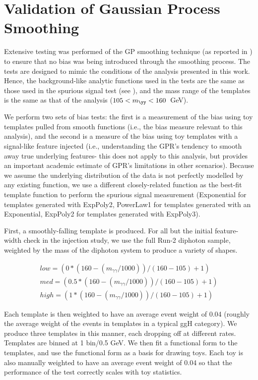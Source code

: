 \section{Validation of Gaussian Process Smoothing}
\label{sec:GPR_validation}
Extensive testing was performed of the GP smoothing technique (as reported in \Sect{\ref{ssec:bkg_smoothing}}) to ensure that no bias was being introduced through the smoothing process. The tests are designed to mimic the conditions of the analysis presented in this work. Hence, the background-like analytic functions used in the tests are the same as those used in the spurious signal test (see \Sect{\ref{ssec:spurious_signal}}), and the mass range of the templates is the same as that of the analysis ($105<m_{\yy}<160$~GeV). 

We perform two sets of bias tests: the first is a measurement of the bias using toy templates pulled from smooth functions (i.e., the bias measure relevant to this analysis), and the second is a measure of the bias using toy templates with a signal-like feature injected (i.e., understanding the GPR's tendency to smooth away true underlying features- this does not apply to this analysis, but provides an important academic estimate of GPR's limitations in other scenarios). Because we assume the underlying distribution of the data is not perfectly modelled by any existing function, we use a different closely-related function as the best-fit template function to perform the spurious signal measurement (Exponential for templates generated with ExpPoly2, PowerLaw1 for templates generated with an Exponential, ExpPoly2 for templates generated with ExpPoly3).

First, a smoothly-falling template is produced. For all but the initial feature-width check in the injection study, we use the full Run-2 \SHERPA diphoton sample, weighted by the mass of the diphoton system to produce a variety of shapes.

\begin{equation}
\begin{split}
low = (0*(160-(m_{\gamma\gamma}/1000))/(160-105)+1) \\
med = (0.5*(160-(m_{\gamma\gamma}/1000))/(160-105)+1) \\
high= (1*(160-(m_{\gamma\gamma}/1000))/(160-105)+1)
\end{split}
\end{equation}

Each template is then weighted to have an average event weight of 0.04 (roughly the average weight of the events in templates in a typical ggH category). We produce three templates in this manner, each dropping off at different rates. Templates are binned at 1 bin/0.5 GeV. We then fit a functional form to the templates, and use the functional form as a basis for drawing toys.  Each toy is also manually weighted to have an average event weight of 0.04 so that the performance of the test correctly scales with toy statistics.

